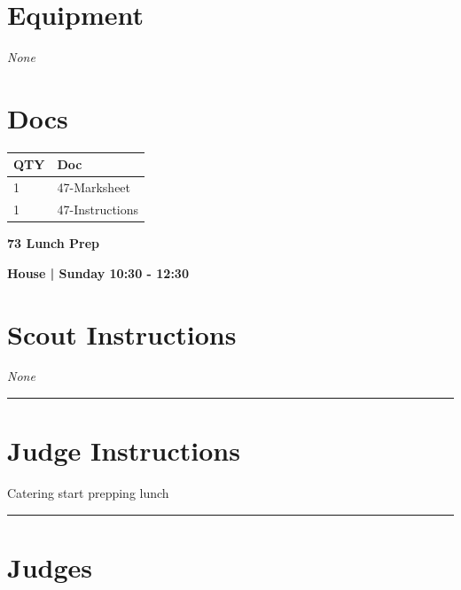 \documentclass[10pt]{article}
\newcommand{\newtitle}[1]{\begin{center}{\Huge\bfseries #1 }\\ \vspace{5mm}\end{center}}
\newcommand{\newsubtitle}[1]{\begin{center}{\color{grey}\Large\bfseries #1 }\\ \vspace{5mm}\end{center}}
\begin{document}
	\begin{multicols}{2}

		\section*{\faWrench \: Equipment}

				\textit{None}
		
		\vfill\null
		\columnbreak

			\section*{\faFile \: Docs}
		 	\begin{center}
			\begin{tabular}{p{2cm}p{4cm}}

			\textbf{QTY} & \textbf{Doc} \\\toprule
										1&47-Marksheet\\\midrule
										1&47-Instructions\\\midrule
							\end{tabular}
			\end{center}
	

		\vfill\null

		\end{multicols}



	\vspace{1cm}


	\clearpage
		\newtitle{73 Lunch Prep }
	\newsubtitle{House | Sunday 10:30 - 12:30}
		\setcounter{section}{72}
	\section*{Scout Instructions}
		\textit{None}
	
	\vspace{0.5cm}
	\hrule
	\vspace{0.5cm}

		\section*{Judge Instructions}
		Catering start prepping lunch
\vspace{0.5cm}
	\hrule
	\vspace{0.5cm}
		\section*{\faUsers \: Judges}
\end{document}
